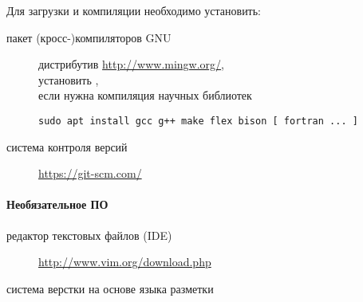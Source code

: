 Для загрузки и компиляции необходимо установить:\bigskip

\begin{description}[nosep]
	\item[\prog{GNU toolchain}] пакет (кросс-)компиляторов GNU\\
\begin{description}
	\item[\win] дистрибутив  \url{http://www.mingw.org/},\\
		установить ,\\
		если нужна компиляция научных библиотек 
	\item[\linux]
	\verb|sudo apt install gcc g++ make flex bison [ fortran ... ]|
\end{description}
	\item[\prog{Git}] система контроля версий\\
\begin{description}
	\item[\win] \url{https://git-scm.com/}
\end{description}
\end{description}

\paragraph{Необязательное ПО\\}

\begin{description}[nosep]
	\item[\vim] редактор текстовых файлов (IDE)\\
\begin{description}
	\item[\win] \url{http://www.vim.org/download.php}
\end{description}
\item[\LaTeX] система верстки на основе языка разметки
\end{description}

